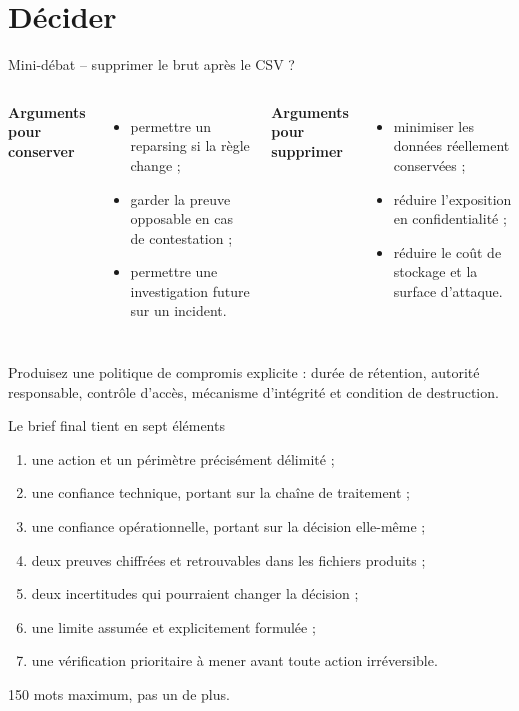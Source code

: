 \documentclass[aspectratio=169]{beamer}
\begin{document}
\section{Décider}
\begin{frame}{Mini-débat -- supprimer le brut après le CSV ?}
\begin{columns}
\textbf{Arguments pour conserver}
\begin{itemize}
\item permettre un reparsing si la règle change ;
\item garder la preuve opposable en cas de contestation ;
\item permettre une investigation future sur un incident.
\end{itemize}
\textbf{Arguments pour supprimer}
\begin{itemize}
\item minimiser les données réellement conservées ;
\item réduire l'exposition en confidentialité ;
\item réduire le coût de stockage et la surface d'attaque.
\end{itemize}
\end{columns}
\vfill
\normalsize Produisez une politique de compromis explicite : durée de rétention, autorité responsable, contrôle d'accès, mécanisme d'intégrité et condition de destruction.
\end{frame}

\begin{frame}{Le brief final tient en sept éléments}
\begin{enumerate}
\item une action et un périmètre précisément délimité ;
\item une confiance technique, portant sur la chaîne de traitement ;
\item une confiance opérationnelle, portant sur la décision elle-même ;
\item deux preuves chiffrées et retrouvables dans les fichiers produits ;
\item deux incertitudes qui pourraient changer la décision ;
\item une limite assumée et explicitement formulée ;
\item une vérification prioritaire à mener avant toute action irréversible.
\end{enumerate}
150 mots maximum, pas un de plus.
\end{frame}
\end{document}

